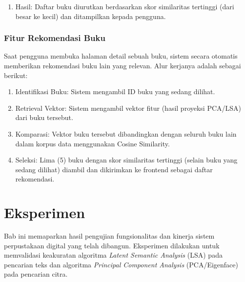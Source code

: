 \documentclass[12pt,a4paper]{article}
\begin{document}
\begin{enumerate}
        \begin{itemize}
            \item Sistem membandingkan vektor \textit{query} yang telah diproyeksikan dengan vektor dokumen buku di \textit{database}.
            \item Metode pengukuran yang digunakan adalah \textit{Cosine Similarity}. Berbeda dengan pencarian citra yang menggunakan \textit{distance}, pada teks kita mencari nilai similaritas mendekati 1 (sudut mendekati $0^\circ$) yang mengindikasikan kemiripan topik/konteks yang tinggi.
        \end{itemize}
    \item Hasil: Daftar buku diurutkan berdasarkan skor similaritas tertinggi (dari besar ke kecil) dan ditampilkan kepada pengguna.
\end{enumerate}

\subsubsection{Fitur Rekomendasi Buku}
Saat pengguna membuka halaman detail sebuah buku, sistem secara otomatis memberikan rekomendasi buku lain yang relevan. Alur kerjanya adalah sebagai berikut:
\begin{enumerate}
    \item Identifikasi Buku: Sistem mengambil ID buku yang sedang dilihat.
    \item Retrieval Vektor: Sistem mengambil vektor fitur (hasil proyeksi PCA/LSA) dari buku tersebut.
    \item Komparasi: Vektor buku tersebut dibandingkan dengan seluruh buku lain dalam korpus data menggunakan Cosine Similarity.
    \item Seleksi: Lima (5) buku dengan skor similaritas tertinggi (selain buku yang sedang dilihat) diambil dan dikirimkan ke frontend sebagai daftar rekomendasi.
\end{enumerate}
\newpage

\section{Eksperimen}

Bab ini memaparkan hasil pengujian fungsionalitas dan kinerja sistem perpustakaan digital yang telah dibangun. Eksperimen dilakukan untuk memvalidasi keakuratan algoritma \textit{Latent Semantic Analysis} (LSA) pada pencarian teks dan algoritma \textit{Principal Component Analysis} (PCA/Eigenface) pada pencarian citra.
\end{document}
